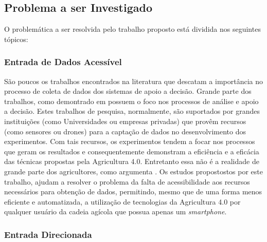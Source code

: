 \documentclass[12pt]{article}
\begin{document}
\subsection{Problema a ser Investigado}
\label{subsec:problema_investigado}

O problemática a ser resolvida pelo trabalho proposto está dividida nos seguintes tópicos:

\subsubsection{Entrada de Dados Acessível}
\label{subsubsec:entrada_dados_acessivel}


São poucos os trabalhos encontrados na literatura que descatam a importância no processo de coleta de dados dos sistemas de apoio a decisão. Grande parte dos trabalhos, como demontrado em \cite{Massruha:2017} possuem o foco nos processos de análise e apoio a decisão. Estes trabalhos de pesquisa, normalmente, são suportados por grandes instituições (como Universidades ou empresas privadas) que provêm recursos (como sensores ou drones) para a captação de dados no desenvolvimento dos experimentos. Com tais recursos, os experimentos tendem a focar nos processos que geram os resultados e consequentemente demonstram a eficiência e a eficácia das técnicas propostas pela Agricultura 4.0. Entretanto essa não é a realidade de grande parte dos agricultores, como argumenta \cite{Rose:2019}. Os estudos propostostos por este trabalho, ajudam a resolver o problema da falta de acessibilidade aos recursos necessários para obtenção de dados, permitindo, mesmo que de uma forma menos eficiente e automatizada, a utilização de tecnologias da Agricultura 4.0 por qualquer usuário da cadeia agícola que possua apenas um \textit{smartphone}.

\subsubsection{Entrada Direcionada}
\label{subsubsec:entrada_direcionada}

\end{document}
